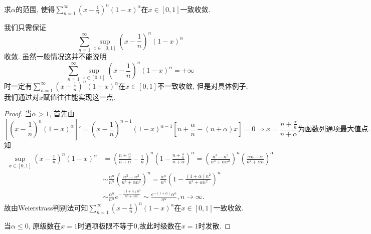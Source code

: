 \documentclass[../../main.tex]{subfiles}%
\begin{document}
\begin{example}
求$\alpha$的范围, 使得$\sum\limits_{n=1}^{\infty}\left(x-\frac{1}{n}\right)^n(1-x)^\alpha$在$x\in[0,1]$一致收敛.
\end{example}
\begin{note}
我们只需保证
$$
\sum_{n=1}^{\infty}\sup_{x\in[0,1]}\left(x-\frac{1}{n}\right)^n(1-x)^\alpha
$$
收敛. 虽然一般情况这并不能说明
$$
\sum_{n=1}^{\infty}\sup_{x\in[0,1]}\left(x-\frac{1}{n}\right)^n(1-x)^\alpha=+\infty
$$
时一定有$\sum\limits_{n=1}^{\infty}\left(x-\frac{1}{n}\right)^n(1-x)^\alpha$在$x\in[0,1]$不一致收敛, 但是对具体例子, 我们通过对$x$赋值往往能实现这一点.
\end{note}
\begin{proof}

当$\alpha>1$, 首先由
$$
\left[\left(x-\frac{1}{n}\right)^n(1-x)^\alpha\right]'=\left(x-\frac{1}{n}\right)^{n-1}(1-x)^{\alpha-1}\left[n+\frac{\alpha}{n}-(n+\alpha)x\right]=0\Rightarrow x=\frac{n+\frac{\alpha}{n}}{n+\alpha}\text{为函数列通项最大值点}.
$$
知
\begin{align*}
\mathop {\mathrm{sup}} \limits_{x\in [0,1]}\left( x-\frac{1}{n} \right) ^n(1-x)^{\alpha}&=\left( \frac{n+\frac{\alpha}{n}}{n+\alpha}-\frac{1}{n} \right) ^n\left( 1-\frac{n+\frac{\alpha}{n}}{n+\alpha} \right) ^{\alpha}=\left( \frac{n^3-n^2}{n^3+\alpha n^2} \right) ^n\left( \frac{\alpha n-\alpha}{n^2+\alpha n} \right) ^{\alpha}
\\
&\sim \frac{\alpha ^{\alpha}}{n^{\alpha}}\left( \frac{n^3-n^2}{n^3+\alpha n^2} \right) ^n=\frac{\alpha ^{\alpha}}{n^{\alpha}}\left( 1-\frac{\left( 1+\alpha \right) n^2}{n^3+\alpha n^2} \right) ^n
\\
&\sim \frac{\alpha ^{\alpha}}{n^{\alpha}}e^{-\frac{\left( 1+\alpha \right) n^3}{n^3+\alpha n^2}}\sim \frac{e^{-(1+\alpha)}\alpha ^{\alpha}}{n^{\alpha}},n\rightarrow \infty .
\end{align*}
故由Weierstrass判别法可知$\sum\limits_{n=1}^{\infty}\left(x-\frac{1}{n}\right)^n(1-x)^\alpha$在$x\in[0,1]$一致收敛.

当$\alpha\leqslant0$, 原级数在$x=1$时通项极限不等于0,故此时级数在$x=1$时发散.


\end{proof}
\end{document}
